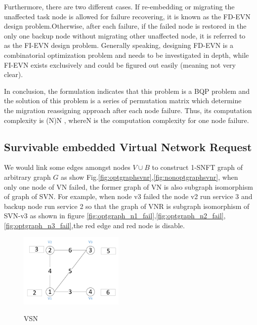 Furthermore, there are two different cases. If re-embedding or
migrating the unaffected task node is allowed for failure recovering,
it is known as the FD-EVN design problem.Otherwise, after
each failure, if the failed node is restored in the only one backup
node without migrating other unaffected node, it is referred to
as the FI-EVN design problem. Generally speaking, designing
FD-EVN is a combinatorial optimization problem and needs to
be investigated in depth, while FI-EVN exists exclusively and
could be figured out easily (meaning not very clear).

In conclusion, the formulation indicates that this problem is
a BQP problem and the solution of this problem is a series of
permutation matrix  which determine the
migration reassigning approach after each node failure. Thus, its
computation complexity is (N)N , whereN is the computation
complexity for one node failure.


\subsection{Survivable embedded Virtual Network Request}
We would link some edges amongst nodes $V\cup B$ to construct 1-SNFT graph of arbitrary graph $G$ as show Fig.\ref{fig:optgraphsvnr},\ref{fig:nonoptgraphsvnr}, when only one node of VN failed, the former graph of VN is also subgraph isomorphism of graph of SVN. For example, when node v3 failed the node v2 run service 3 and backup node run service 2 so that the graph of VNR is subgraph isomorphism of SVN-v3 as shown in figure \ref{fig:optgraph_n1_fail},\ref{fig:optgraph_n2_fail},\ref{fig:optgraph_n3_fail},the red edge and red node is disable.


\begin{figure}
\centering
\includegraphics[width=2in]{Fig/VSN}\\
\caption{VSN}\label{fig:VSN}
\end{figure}

